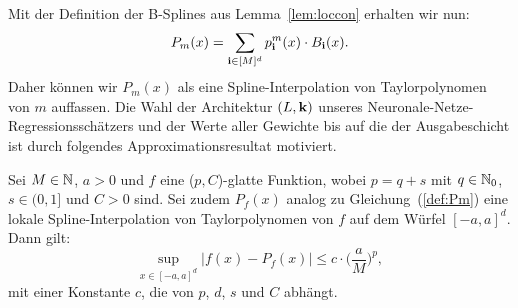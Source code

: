 Mit der Definition der B-Splines aus Lemma~\ref{lem:loccon} erhalten wir nun:
\begin{equation}
\label{def:Pm}
\begin{split}
P_m(x) = \sum_{\mathbf{i} \in [M]^d} p_{\mathbf{i}}^m(x) \cdot B_{\mathbf{i}}(x).
\end{split}
\end{equation}
Daher können wir $P_m(x)$ als eine Spline-Interpolation von Taylorpolynomen von $m$ auffassen.
Die Wahl der Architektur $(L,\mathbf{k})$ unseres Neuronale-Netze-Regressionsschätzers und der Werte aller Gewichte bis auf die der Ausgabeschicht ist durch folgendes Approximationsresultat motiviert.
\begin{lem}
\label{lem:pcsmooth}
Sei $M \in \mathbb{N}$, $a > 0$ und $f$ eine ($p, C$)-glatte Funktion, wobei $p = q + s$ mit $q \in \mathbb{N}_0$, $s \in (0,1]$ und $C > 0$ sind. Sei zudem $P_f(x)$ analog zu Gleichung~(\ref{def:Pm}) eine lokale Spline-Interpolation von Taylorpolynomen von $f$ auf dem Würfel $[-a,a]^d$. Dann gilt:
$$\sup_{x \in [-a, a]^d} |f(x) - P_f(x)|  \leq c \cdot \bigg(\frac{a}{M}\bigg)^p,$$
mit einer Konstante $c$, die von $p$, $d$, $s$ und $C$ abhängt.
\end{lem}

